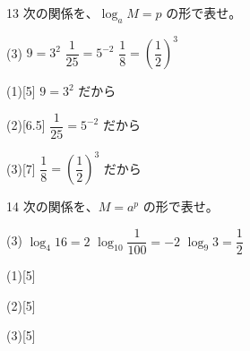 \documentclass[14pt,dvipdfmx]{jsarticle}
\begin{document}
\begin{practiceprob}{13}
  次の関係を、$\log_{a} M = p$ の形で表せ。
  \begin{tasks}[label=(\arabic*), label-width=1.6zw, item-indent=2zw, after-item-skip=0.15em](3)
    \task $9 = 3^2$
    \task $\dfrac{1}{25} = 5^{-2}$
    \task $\dfrac{1}{8} = \left(\dfrac{1}{2}\right)^3$
  \end{tasks}
\end{practiceprob}

\begin{answerbox}{(1)}[5]
  $9=3^2$ だから
\end{answerbox}
\begin{answerbox}{(2)}[6.5]
  $\dfrac{1}{25}=5^{-2}$ だから
\end{answerbox}
\begin{answerbox}{(3)}[7]
  $\dfrac{1}{8}=\left(\dfrac{1}{2}\right)^3$ だから
\end{answerbox}

\begin{practiceprob}{14}
  次の関係を、$M = a^{p}$ の形で表せ。
  \begin{tasks}[label=(\arabic*), label-width=1.6zw, item-indent=2zw, after-item-skip=0.1em](3)
    \task $\log_{4} 16 = 2$
    \task $\log_{10} \dfrac{1}{100} = -2$
    \task $\log_{9} 3 = \dfrac{1}{2}$
  \end{tasks}
\end{practiceprob}

\noindent
\begin{minipage}[t]{0.32\linewidth}
\begin{answerbox}{(1)}[5]
\end{answerbox}
\end{minipage}\hfill
\begin{minipage}[t]{0.32\linewidth}
\begin{answerbox}{(2)}[5]
\end{answerbox}
\end{minipage}\hfill
\begin{minipage}[t]{0.32\linewidth}
\begin{answerbox}{(3)}[5]
\end{answerbox}
\end{minipage}

\vfill
\nextpage
\end{document}
